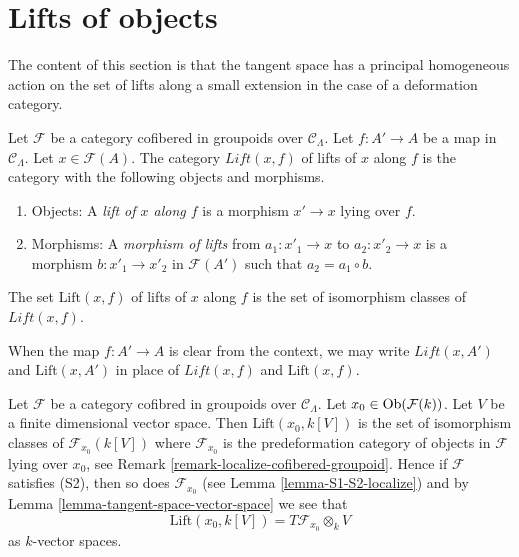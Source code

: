 \section{Lifts of objects}
\label{section-lifts}

\noindent
The content of this section is that the tangent space has a principal
homogeneous action on the set of lifts along a small extension
in the case of a deformation category.

\begin{definition}
\label{definition-lifts}
Let $\mathcal{F}$ be a category cofibered in groupoids over
$\mathcal{C}_\Lambda$. Let $f: A' \to A$ be a map in $\mathcal{C}_\Lambda$.
Let $x \in \mathcal{F}(A)$. The category $\textit{Lift}(x, f)$ of lifts of $x$
along $f$ is the category with the following objects and
morphisms.
\begin{enumerate}
\item Objects: A {\it lift of $x$ along $f$} is a morphism $x' \to x$
lying over $f$.
\item Morphisms: A {\it morphism of lifts} from $a_1 : x'_1 \to x$ to
$a_2 : x'_2 \to x$ is a morphism $b : x'_1 \to x'_2$ in
$\mathcal{F}(A')$ such that $a_2 = a_1 \circ b$.
\end{enumerate}
The set $\text{Lift}(x, f)$ of lifts of $x$ along $f$ is the set of
isomorphism classes of $\textit{Lift}(x, f)$.
\end{definition}

\begin{remark}
\label{remark-omit-arrow}
When the map $f: A' \to A$ is clear from the context, we may write
$\textit{Lift}(x, A')$ and $\text{Lift}(x, A')$ in place of
$\textit{Lift}(x, f)$ and $\text{Lift}(x, f)$.
\end{remark}

\begin{remark}
\label{remark-tangent-space-lifting}
Let $\mathcal{F}$ be a category cofibred in groupoids over
$\mathcal{C}_\Lambda$. Let $x_0 \in \mathop{\mathrm{Ob}}\nolimits(\mathcal{F}(k))$.
Let $V$ be a finite dimensional vector space.
Then $\text{Lift}(x_0, k[V])$ is the set of isomorphism classes
of $\mathcal{F}_{x_0}(k[V])$ where $\mathcal{F}_{x_0}$ is the
predeformation category of objects in $\mathcal{F}$ lying over
$x_0$, see
Remark \ref{remark-localize-cofibered-groupoid}.
Hence if $\mathcal{F}$ satisfies (S2), then so does
$\mathcal{F}_{x_0}$ (see
Lemma \ref{lemma-S1-S2-localize})
and by
Lemma \ref{lemma-tangent-space-vector-space}
we see that
$$
\text{Lift}(x_0, k[V]) = T\mathcal{F}_{x_0} \otimes_k V
$$
as $k$-vector spaces.
\end{remark}

